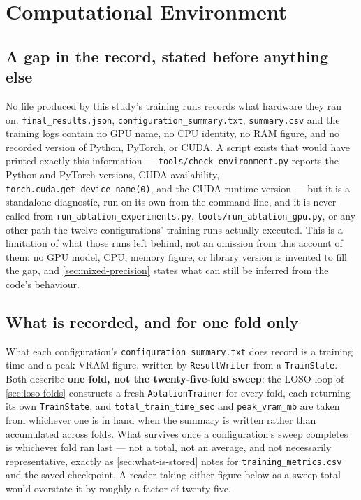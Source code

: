 \section{Computational Environment}
\label{sec:computational-environment}

\subsection{A gap in the record, stated before anything else}
\label{sec:record-gap}

No file produced by this study's training runs records what hardware they ran on. \texttt{final\_results.json}, \texttt{configuration\_summary.txt}, \texttt{summary.csv} and the training logs contain no GPU name, no CPU identity, no RAM figure, and no recorded version of Python, PyTorch, or CUDA. A script exists that would have printed exactly this information --- \texttt{tools/check\_environment.py} reports the Python and PyTorch versions, CUDA availability, \verb|torch.cuda.get_device_name(0)|, and the CUDA runtime version --- but it is a standalone diagnostic, run on its own from the command line, and it is never called from \texttt{run\_ablation\_experiments.py}, \texttt{tools/run\_ablation\_gpu.py}, or any other path the twelve configurations' training runs actually executed. This is a limitation of what those runs left behind, not an omission from this account of them: no GPU model, CPU, memory figure, or library version is invented to fill the gap, and \autoref{sec:mixed-precision} states what can still be inferred from the code's behaviour.

\subsection{What is recorded, and for one fold only}
\label{sec:one-fold-only}

What each configuration's \texttt{configuration\_summary.txt} does record is a training time and a peak VRAM figure, written by \texttt{ResultWriter} from a \texttt{TrainState}. Both describe \textbf{one fold, not the twenty-five-fold sweep}: the LOSO loop of \autoref{sec:loso-folds} constructs a fresh \texttt{AblationTrainer} for every fold, each returning its own \texttt{TrainState}, and \texttt{total\_train\_time\_sec} and \texttt{peak\_vram\_mb} are taken from whichever one is in hand when the summary is written rather than accumulated across folds. What survives once a configuration's sweep completes is whichever fold ran last --- not a total, not an average, and not necessarily representative, exactly as \autoref{sec:what-is-stored} notes for \texttt{training\_metrics.csv} and the saved checkpoint. A reader taking either figure below as a sweep total would overstate it by roughly a factor of twenty-five.

